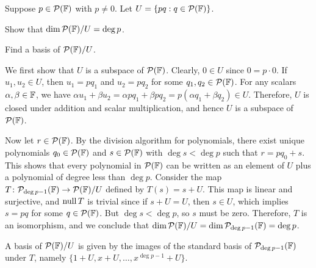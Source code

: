 \begin{exercise}
Suppose $p\in\mathcal{P}(\mathbb{F})$ with $p\ne0$. Let $U=\{pq : q\in\mathcal{P}(\mathbb{F})\}$.
\begin{parts}
\item Show that $\operatorname{dim}\mathcal{P}(\mathbb{F})/U=\deg p$.
\item Find a basis of $\mathcal{P}(\mathbb{F})/U$.
\end{parts}
\end{exercise}
\begin{solution}\leavevmode
\begin{parts}
\item We first show that $U$ is a subspace of $\mathcal{P}(\mathbb{F})$. Clearly, $0\in U$
  since $0=p\cdot0$. If $u_1,u_2\in U$, then $u_1=pq_1$ and $u_2=pq_2$ for some
  $q_1,q_2\in\mathcal{P}(\mathbb{F})$. For any scalars $\alpha,\beta\in\mathbb{F}$, we have
  $\alpha u_1+\beta u_2=\alpha pq_1+\beta pq_2=p(\alpha q_1+\beta q_2)\in U$.
  Therefore, $U$ is closed under addition and scalar multiplication, and hence
  $U$ is a subspace of $\mathcal{P}(\mathbb{F})$.

  Now let $r\in\mathcal{P}(\mathbb{F})$. By the division algorithm for polynomials, there
  exist unique polynomials $q_0\in\mathcal{P}(\mathbb{F})$ and $s\in\mathcal{P}(\mathbb{F})$ with
  $\deg s<\deg p$ such that $r=pq_0+s$. This shows that every polynomial in
  $\mathcal{P}(\mathbb{F})$ can be written as an element of $U$ plus a polynomial of degree
  less than $\deg p$. Consider the map
  $T\colon\mathcal{P}_{\deg p-1}(\mathbb{F})\to\mathcal{P}(\mathbb{F})/U$ defined by $T(s)=s+U$. This map
  is linear and surjective, and $\operatorname{null} T$ is trivial since if $s+U=U$, then
  $s\in U$, which implies $s=pq$ for some $q\in\mathcal{P}(\mathbb{F})$. But
  $\deg s<\deg p$, so $s$ must be zero. Therefore, $T$ is an isomorphism, and
  we conclude that $\operatorname{dim}\mathcal{P}(\mathbb{F})/U=\operatorname{dim}\mathcal{P}_{\deg p-1}(\mathbb{F})=\deg p$.
\item A basis of $\mathcal{P}(\mathbb{F})/U$ is given by the images of the standard basis of
  $\mathcal{P}_{\deg p-1}(\mathbb{F})$ under $T$, namely
  $\{1+U,x+U,\dots,x^{\deg p-1}+U\}$. \qedhere
\end{parts}
\end{solution}

